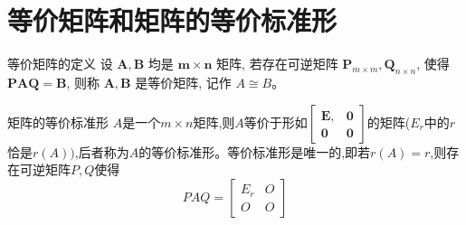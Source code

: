 \documentclass[8pt a4paper,oneside,UTF8]{ctexbook}
\begin{document}
\begin{sloppypar}
    \section{等价矩阵和矩阵的等价标准形}
    \begin{defn}{等价矩阵的定义}{}
        设 $\boldsymbol{A}, \boldsymbol{B}$ 均是 $\boldsymbol{m} \times \boldsymbol{n}$ 矩阵, 若存在可逆矩阵 $\boldsymbol{P}_{m \times m}, \boldsymbol{Q}_{n \times n}$, 使得 $\boldsymbol{P A Q}=\boldsymbol{B}$, 则称 $\boldsymbol{A}, \boldsymbol{B}$ 是等价矩阵, 记作 $A \cong B$。
    \end{defn}
    \begin{defn}{矩阵的等价标准形}{}
        $A$是一个$m\times n$矩阵,则$A$等价于形如$\begin{bmatrix}\boldsymbol{E},&\boldsymbol{0}\\\boldsymbol{0}&\boldsymbol{0}\end{bmatrix}$的矩阵($E_r$中的$r$恰是$r(A))$,后者称为$A$的等价标准形。等价标准形是唯一的,即若$r(A)=r$,则存在可逆矩阵$P,Q$使得$$PAQ=\begin{bmatrix}E_r&O\\O&O\end{bmatrix}$$
    \end{defn}

\end{sloppypar}
\end{document}
